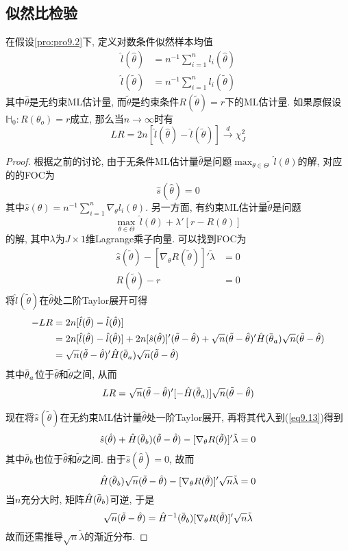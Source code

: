 \documentclass[cn, 12pt, math=mtpro2, bibstyle=apa, blue, twocol]{elegantbook}
\newcommand{\HH}{\mathbb{H}}
\newcommand{\hth}{\hat{\theta}}
\newcommand{\overbar}[1]{\mkern 1.5mu\overline{\mkern-1.5mu#1\mkern-1.5mu}\mkern 1.5mu}
\begin{document}
\subsection{似然比检验}
\begin{theorem}
  在假设\ref{pro:pro9.2}下, 定义对数条件似然样本均值
  \begin{align*}
  \hat{l}(\hth)&=n^{-1}\sum_{i=1}^{n}l_i(\hth) \\ \hat{l}(\tilde{\theta})&=n^{-1}\sum_{i=1}^{n}l_i(\tilde{\theta})
  \end{align*}
  其中$\hth$是无约束ML估计量, 而$\tilde{\theta}$是约束条件$R(\tilde{\theta})=r$下的ML估计量. 如果原假设$\HH_0: R(\theta_o)=r$成立, 那么当$n\to\infty$时有
  $$LR=2n[\hat{l}(\hth)-\hat{l}(\tilde{\theta})]\xrightarrow{d}\chi^2_J$$
\end{theorem}
\begin{proof}
  根据之前的讨论, 由于无条件ML估计量$\hth$是问题$\max_{\theta\in\Theta}\, \hat{l}(\theta)$的解, 对应的的FOC为
  $$\hat{s}(\hth)=0$$
  其中$\hat{s}(\theta)=n^{-1}\sum_{i=1}^{n}\nabla_\theta l_i(\theta)$. 另一方面, 有约束ML估计量$\tilde{\theta}$是问题
  $$\max_{\theta\in\Theta}\,\hat{l}(\theta)+\lambda'[r-R(\theta)]$$
  的解, 其中$\lambda$为$J\times1$维Lagrange乘子向量. 可以找到FOC为
  \begin{align}
  \hat{s}(\tilde{\theta})-[\nabla_\theta R(\tilde{\theta})]'\tilde{\lambda}&=0 \label{eq9.13} \\
  R(\tilde{\theta})-r&=0 \nonumber
  \end{align}
  将$\hat{l}(\tilde{\theta})$在$\hth$处二阶Taylor展开可得
  \begin{align*}
  -LR&=2n[\hat{l}(\tilde{\theta})-\hat{l}(\hth)] \\
  &=2n[\hat{l}(\hth)-\hat{l}(\hat{\theta})]+2n[\hat{s}(\hth)]'(\tilde{\theta}-\hth)+\sqrt{n}(\tilde{\theta}-\hth)'\hat{H}(\overbar{\theta}_a)\sqrt{n}(\tilde{\theta}-\hth) \\
  &=\sqrt{n}(\tilde{\theta}-\hth)'\hat{H}(\overbar{\theta}_a)\sqrt{n}(\tilde{\theta}-\hth)
  \end{align*}
  其中$\overbar{\theta}_a$位于$\hat{\theta}$和$\tilde{\theta}$之间, 从而
  \begin{equation*}
    LR=\sqrt{n}(\tilde{\theta}-\hth)'[-\hat{H}(\overbar{\theta}_a)]\sqrt{n}(\tilde{\theta}-\hth)
  \end{equation*}

  现在将$\hat{s}(\tilde{\theta})$在无约束ML估计量$\hth$处一阶Taylor展开, 再将其代入到(\ref{eq9.13})得到
  $$\hat{s}(\hth)+\hat{H}(\overbar{\theta}_b)(\tilde{\theta}-\hth)-[\nabla_\theta R(\tilde{\theta})]'\tilde{\lambda}=0$$
  其中$\overbar{\theta}_b$也位于$\hat{\theta}$和$\tilde{\theta}$之间. 由于$\hat{s}(\hth)=0$, 故而
  $$\hat{H}(\overbar{\theta}_b)\sqrt{n}(\tilde{\theta}-\hth)-[\nabla_\theta R(\tilde{\theta})]'\sqrt{n}\tilde{\lambda}=0$$
  当$n$充分大时, 矩阵$\hat{H}(\overbar{\theta}_b)$可逆, 于是
  \begin{equation}\label{eq9.17}
    \sqrt{n}(\tilde{\theta}-\hth)=\hat{H}^{-1}(\overbar{\theta}_b)[\nabla_\theta R(\tilde{\theta})]'\sqrt{n}\tilde{\lambda}
  \end{equation}
  故而还需推导$\sqrt{n}\tilde{\lambda}$的渐近分布.


\end{proof}
\end{document}
